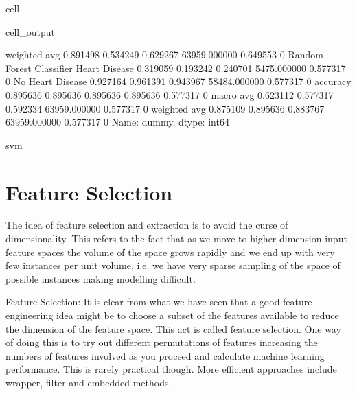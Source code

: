 \documentclass[letterpaper,10pt,english]{jupyterBook}
\begin{document}
\begin{sphinxuseclass}{cell}
\begin{sphinxVerbatimOutput}
\begin{sphinxuseclass}{cell_output}
\begin{sphinxVerbatim}[commandchars=\\\{\}]
                           weighted avg      0.891498   0.534249  0.629267  63959.000000  0.649553    0
Random Forest Classifier   Heart Disease     0.319059   0.193242  0.240701  5475.000000   0.577317    0
                           No Heart Disease  0.927164   0.961391  0.943967  58484.000000  0.577317    0
                           accuracy          0.895636   0.895636  0.895636  0.895636      0.577317    0
                           macro avg         0.623112   0.577317  0.592334  63959.000000  0.577317    0
                           weighted avg      0.875109   0.895636  0.883767  63959.000000  0.577317    0
Name: dummy, dtype: int64

svm
\PYGZhy{}\PYGZhy{}\PYGZhy{}\PYGZhy{}\PYGZhy{}\PYGZhy{}\PYGZhy{}\PYGZhy{}\PYGZhy{}\PYGZhy{}\PYGZhy{}\PYGZhy{}\PYGZhy{}\PYGZhy{}\PYGZhy{}\PYGZhy{}\PYGZhy{}\PYGZhy{}\PYGZhy{}
\end{sphinxVerbatim}

\end{sphinxuseclass}\end{sphinxVerbatimOutput}

\end{sphinxuseclass}

\section{Feature Selection}
\label{\detokenize{Model_evaluation:feature-selection}}
\sphinxAtStartPar
The idea of feature selection and extraction is to avoid the curse of
dimensionality. This refers to the fact that as we move to higher
dimension input feature spaces the volume of the space grows rapidly
and we end up with very few instances per unit volume, i.e. we have
very sparse sampling of the space of possible instances making
modelling difficult.

\sphinxAtStartPar
Feature Selection: It is clear from what we have seen that a good feature engineering
idea might be to choose a subset of the features available to reduce
the dimension of the feature space. This act is called feature
selection. One way of doing this is to try out different permutations of
features increasing the numbers of features involved as you proceed
and calculate machine learning performance. This is rarely practical
though. More efficient approaches include wrapper, filter and
embedded methods.
\end{document}
